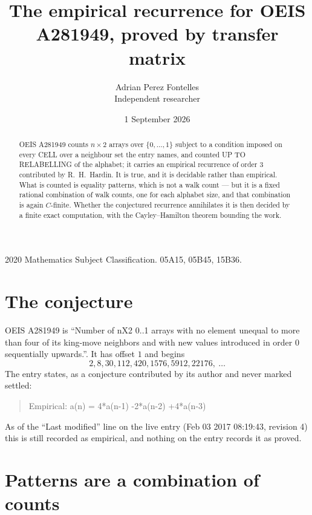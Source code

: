\documentclass[11pt,a4paper]{article}
\title{The empirical recurrence for OEIS A281949, proved by transfer matrix}
\author{Adrian Perez Fontelles\\ \small Independent researcher}
\date{1 September 2026}
\theoremstyle{plain}
\theoremstyle{definition}
\begin{document}
\maketitle

\begin{abstract}
OEIS A281949 counts $n\times2$ arrays over $\{0,\dots,1\}$ subject to a condition imposed on
every CELL over a neighbour set the entry names, and counted UP TO RELABELLING of the
alphabet; it carries an empirical recurrence of order $3$ contributed by
R.~H.~Hardin. It is true, and it is decidable rather than empirical. What is counted is
equality patterns, which is not a walk count --- but it is a fixed rational combination of
walk counts, one for each alphabet size, and that combination is again $C$-finite. Whether the
conjectured recurrence annihilates it is then decided by a finite exact computation, with the
Cayley--Hamilton theorem bounding the work.
\end{abstract}

\noindent\small 2020 Mathematics Subject Classification. 05A15, 05B45, 15B36.\normalsize

\section{The conjecture}

OEIS A281949 is ``Number of nX2 0..1 arrays with no element unequal to more than four of its king-move neighbors and with new values introduced in order 0 sequentially upwards.''. It has offset $1$ and begins
\[
2, 8, 30, 112, 420, 1576, 5912, 22176,\ \dots
\]
The entry states, as a conjecture contributed by its author and never marked settled:
\begin{quote}
Empirical: a(n) = 4*a(n-1) -2*a(n-2) +4*a(n-3)
\end{quote}
As of the ``Last modified'' line on the live entry (Feb 03 2017 08:19:43, revision 4) this is still
recorded as empirical, and nothing on the entry records it as proved.

\section{Patterns are a combination of counts}
\end{document}
